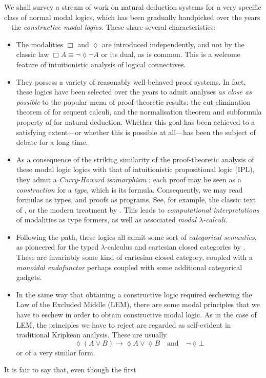 \documentclass[a4paper]{amsart}
\begin{document}
We shall survey a stream of work on natural deduction systems for
a very specific class of normal modal logics, which has been
gradually handpicked over the years---the \emph{constructive modal
logics}. These share several characteristics: \begin{itemize}
  \item The modalities $\Box$ and $\lozenge$ are introduced
  independently, and not by the classic law $\Box A \equiv
  \lnot\lozenge\lnot A$ or its dual, as is common.  This is a
  welcome feature of intuitionistic analysis of logical
  connectives.

  \item They possess a variety of reasonably well-behaved proof
  systems. In fact, these logics have been selected over the years
  to admit analyses \emph{as close as possible} to the popular
  menu of proof-theoretic results: the cut-elimination theorem of
  \cite{Gentzen1935a, Gentzen1935b} for sequent calculi, and the
  normalisation theorem and subformula property of
  \cite{Prawitz1965} for natural deduction. Whether this goal has
  been achieved to a satisfying extent---or whether this is
  possible at all---has been the subject of debate for a long
  time.

  \item As a consequence of the striking similarity of the
  proof-theoretic analysis of these modal logic logics with that of
  intuitionistic propositional logic (\textsf{IPL}), they
  admit a \emph{Curry-Howard isomorphism} \citep{Curry1958,
  Howard1980}: each proof may be seen as a \emph{construction} for
  a \emph{type}, which is its formula. Consequently, we may read
  formulas as types, and proofs as programs. See, for example, the
  classic text of \cite{Girard1989}, or the modern treatment by
  \cite{Sorensen2006}. This leads to \emph{computational
  interpretations} of modalities as type formers, as well as
  associated \emph{modal $\lambda$-calculi}.

  \item Following the path, these logics all admit some sort of
  \emph{categorical semantics}, as pioneered for the typed
  $\lambda$-calculus and cartesian closed categories by
  \cite{Lambek1980}. These are invariably some kind of
  cartesian-closed category, coupled with a \emph{monoidal
  endofunctor} perhaps coupled with some additional categorical
  gadgets.

  \item In the same way that obtaining a constructive logic
  required eschewing the Law of the Excluded Middle
  (\textsf{LEM}), there are some modal principles that we have to
  eschew in order to obtain constructive modal
  logic. As in the case of \textsf{LEM}, the principles we have to
  reject are regarded as self-evident in traditional Kripkean
  analysis. These are usually \[
    \lozenge (A \vee B) \rightarrow \lozenge A \vee \lozenge B
      \quad\text{and}\quad
    \lnot\lozenge\bot
  \] or of a very similar form.
\end{itemize} It is fair to say that, even though the first
\end{document}
